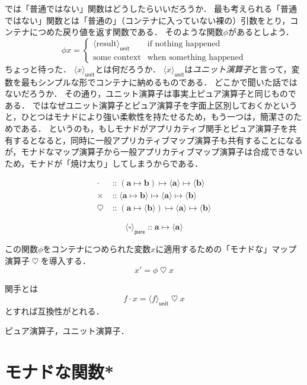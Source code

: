\documentclass[twocolumn]{jsbook}
\newcommand{\keyword}[1]{{\emph{#1}}}
\newcommand{\hsklType}[1]{\textbf{#1}}
\DeclareMathOperator{\hsklApplicativeMap}{\times}
\DeclareMathOperator{\hsklFmap}{\cdot}
\DeclareMathOperator{\hsklMonadMap}{\heartsuit}
\newcommand{\hsklPure}[1]{\langle#1\rangle_\textsf{pure}}
\newcommand{\hsklUnit}[1]{\langle#1\rangle_\textsf{unit}}
\DeclareMathOperator{\mathIn}{::}
\DeclareMathOperator{\mathMapsTo}{\mapsto}
\newcommand{\mathSomething}{\square}
\newcommand{\mathMorph}[2]{#1\mathMapsTo#2}
\newcommand{\mathMorphII}[3]{#1\mathMapsTo#2\mathMapsTo#3}
\begin{document}
では「普通ではない」関数はどうしたらいいだろうか．
最も考えられる「普通ではない」関数とは「普通の」（コンテナに入っていない裸の）引数をとり，コンテナにつめた戻り値を返す関数である．
そのような関数$\phi$があるとしよう．
$$\phi x=\begin{cases}\hsklUnit{\text{result}}&\text{if nothing happened}\\
\text{some context}&\text{when something happened}\end{cases}$$
ちょっと待った．
$\hsklUnit{x}$とは何だろうか．
$\hsklUnit{x}$は\keyword{ユニット演算子}と言って，変数を最もシンプルな形でコンテナに納めるものである．
どこかで聞いた話ではないだろうか．
その通り，ユニット演算子は事実上ピュア演算子と同じものである．
ではなぜユニット演算子とピュア演算子を字面上区別しておくかというと，ひとつはモナドにより強い柔軟性を持たせるため，もう一つは，簡潔さのためである．
というのも，もしモナドがアプリカティブ関手とピュア演算子を共有するとなると，同時に一般アプリカティブマップ演算子も共有することになるが，モナドなマップ演算子から一般アプリカティブマップ演算子は合成できないため，モナドが「焼け太り」してしまうからである．

\begin{align*}
\hsklFmap&\mathIn{}\mathMorphII{(\mathMorph{\hsklType{a}}{\hsklType{b}})}{\langle\hsklType{a}\rangle}{\langle\hsklType{b}
\rangle}\\
\hsklApplicativeMap&\mathIn{}\mathMorphII{\langle\mathMorph{\hsklType{a}}{\hsklType{b}}\rangle}{\langle\hsklType{a}\rangle}{\langle\hsklType{b}\rangle}\\
\hsklMonadMap&\mathIn{}\mathMorphII{(\mathMorph{\hsklType{a}}{\langle\hsklType{b}\rangle})}{\langle\hsklType{a}\rangle}{\langle{\hsklType{b}}\rangle}
\end{align*}

$$\hsklPure{\mathSomething}\mathIn\mathMorph{\hsklType{a}}{\langle\hsklType{a}\rangle}$$

この関数$\phi$をコンテナにつめられた変数$x$に適用するための「モナドな」マップ演算子$\hsklMonadMap$を導入する．
$$x'=\phi\hsklMonadMap x$$

関手とは
$$f\hsklFmap x=\hsklUnit{f}\hsklMonadMap x$$
とすれば互換性がとれる．


ピュア演算子，ユニット演算子．


\section{モナドな関数*}
\end{document}
